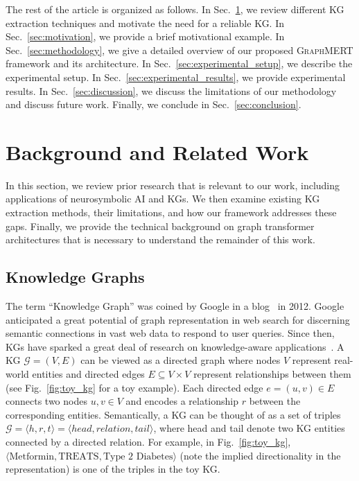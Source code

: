 \documentclass[10pt]{article}
\newcommand{\ours}{\textsc{GraphMERT}\xspace}
\begin{document}
The rest of the article is organized as follows. In Sec.~\ref{sec:background}, we review different KG extraction techniques and motivate the need for a reliable KG. In Sec.~\ref{sec:motivation}, we provide a brief motivational example. In Sec.~\ref{sec:methodology}, we give a detailed overview of our proposed \ours framework and its architecture. In Sec.~\ref{sec:experimental_setup}, we describe the experimental setup. In Sec.~\ref{sec:experimental_results}, we provide experimental results. In Sec.~\ref{sec:discussion}, we discuss the limitations of our methodology and discuss future work. Finally, we conclude in Sec.~\ref{sec:conclusion}.

\section{Background and Related Work}
\label{sec:background}

In this section, we review prior research that is relevant to our work, including applications of neurosymbolic AI and KGs. We then examine existing KG extraction methods, their limitations, and how our framework addresses these gaps. Finally, we provide the technical background on graph transformer architectures that is necessary to understand the remainder of this work.

\subsection{Knowledge Graphs}
\label{subsec:kg}

The term ``Knowledge Graph'' was coined by Google in a blog~\cite{Singhal2012KG} in 2012. Google anticipated a great potential of graph representation in web search for discerning semantic connections in vast web data to respond to user queries. Since then, KGs have sparked a great deal of research on knowledge-aware applications~\cite{zhang_10884362}. 
A KG $\mathcal{G}=(V,E)$ can be viewed as a directed graph where nodes \(V\) represent real-world entities and directed edges $E \subseteq V \times V$ represent relationships between them (see Fig.~\ref{fig:toy_kg} for a toy example). Each directed edge \(e = (u, v) \in E\) connects two nodes \(u, v \in V\) and encodes a relationship $r$ between the corresponding entities. Semantically, a KG can be thought of as a set of triples $\mathcal{G} = {\langle h, r, t\rangle = \langle head, relation, tail\rangle}$, where head and tail denote two KG entities connected by a directed relation. For example, in Fig.~\ref{fig:toy_kg}, $\langle \text{Metformin}, \text{TREATS}, \text{Type\ 2\ Diabetes}\rangle$ (note the implied directionality in the representation) is one of the triples in the toy KG.
\end{document}
